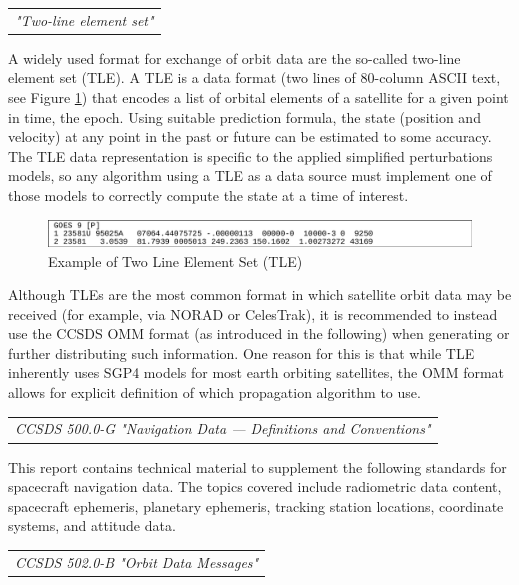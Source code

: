 \begin{tabular}{l}
\textit{"Two-line element set" \cite{wiki-TLE}} \\
\end{tabular}

A widely used format for exchange of orbit data are the so-called two-line element set (TLE). A TLE is a data format (two lines of 80-column ASCII text, see Figure \ref{fig:Example of Two Line Element Set (TLE)}) that encodes a list of orbital elements of a satellite for a given point in time, the epoch. Using suitable prediction formula, the state (position and velocity) at any point in the past or future can be estimated to some accuracy. The TLE data representation is specific to the applied simplified perturbations models, so any algorithm using a TLE as a data source must implement one of those models to correctly compute the state at a time of interest.

\begin{figure}[h]
\centering\includegraphics[scale=0.35]{fig/example_of_tle}
\caption{Example of Two Line Element Set (TLE)}
\label{fig:Example of Two Line Element Set (TLE)}
\end{figure}

Although TLEs are the most common format in which satellite orbit data may be received (for example, via NORAD or CelesTrak), it is recommended to instead use the CCSDS OMM format (as introduced in the following) when generating or further distributing such information. One reason for this is that while TLE inherently uses SGP4 models for most earth orbiting satellites, the OMM format allows for explicit definition of which propagation algorithm to use.

\begin{tabular}{l}
\textit{CCSDS 500.0-G "Navigation Data — Definitions and Conventions" \cite{CCSDS 500.0-G}} \\
\end{tabular}

This report contains technical material to supplement the following standards for spacecraft navigation data. The topics covered include radiometric data content, spacecraft ephemeris, planetary ephemeris, tracking station locations, coordinate systems, and attitude data. 

\begin{tabular}{l}
\textit{CCSDS 502.0-B "Orbit Data Messages" \cite{CCSDS 502.0-B}} \\
\end{tabular}

